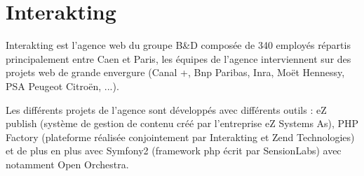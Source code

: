 \section{Interakting}


        Interakting est l'agence web du groupe B\&D  composée de 340 employés répartis principalement entre Caen et Paris, les équipes de l'agence interviennent sur des projets web  de grande envergure (Canal +, Bnp Paribas, Inra, Moët Hennessy, PSA Peugeot Citroën, ...).
        
  
        Les différents projets de l'agence sont développés avec différents outils : eZ publish (système de gestion de contenu créé par l'entreprise eZ Systems As), PHP Factory (plateforme réalisée conjointement par Interakting et Zend Technologies) et de plus en plus avec Symfony2 (framework php écrit par SensionLabs) avec notamment Open Orchestra.

        
        
        